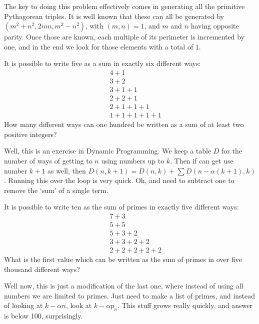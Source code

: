 The key to doing this problem effectively comes in generating all the primitive Pythagorean triples.  It is well known that these can all be generated by $(m^2+n^2, 2mn, m^2-n^2)$, with $(m,n) = 1$, and $m$ and $n$ having opposite parity.
Once those are known, each multiple of its perimeter is incremented by one, and in the end we look for those elements with a total of 1.





It is possible to write five as a sum in exactly six different ways:
\begin{eqnarray*}
&&4 + 1                 \\
&&3 + 2                 \\
&&3 + 1 + 1             \\
&&2 + 2 + 1             \\
&&2 + 1 + 1 + 1         \\
&&1 + 1 + 1 + 1 + 1
\end{eqnarray*}
How many different ways can one hundred be written as a sum of at least two positive integers?

Well, this is an exercise in Dynamic Programming.  We keep a table $D$ for the number of ways of getting to $n$
using numbers up to $k$.  Then if can get use number $k+1$ as well, then $D(n,k+1) = D(n, k)+\sum D(n-\alpha(k+1),k)$.
Running this over the loop is very quick.  Oh, and need to subtract one to remove the `sum' of a single term.




It is possible to write ten as the sum of primes in exactly five different ways:
\begin{eqnarray*}
&&7 + 3             \\
&&5 + 5             \\
&&5 + 3 + 2         \\
&&3 + 3 + 2 + 2     \\
&&2 + 2 + 2 + 2 + 2
\end{eqnarray*}
What is the first value which can be written as the sum of primes in over five thousand different ways?

Well now, this is just a modification of the last one, where instead of using all numbers we are limited to primes.
Just need to make a list of primes, and instead of looking at $k-\alpha n$, look at $k-\alpha p_n$.  This stuff grows really quickly, and answer is below 100, surprisingly.


